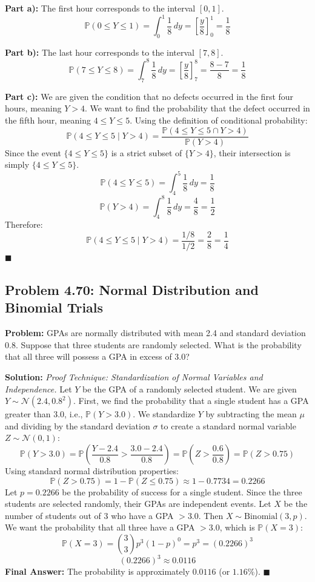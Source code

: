 \documentclass[11pt, a4paper]{article}
\theoremstyle{definition}
\theoremstyle{remark}
\newcommand{\Prob}{\mathbb{P}}
\begin{document}
\textbf{Part a):} The first hour corresponds to the interval $[0, 1]$.
\[ \Prob(0 \le Y \le 1) = \int_{0}^{1} \frac{1}{8} \, dy = \left[ \frac{y}{8} \right]_{0}^{1} = \frac{1}{8} \]

\textbf{Part b):} The last hour corresponds to the interval $[7, 8]$.
\[ \Prob(7 \le Y \le 8) = \int_{7}^{8} \frac{1}{8} \, dy = \left[ \frac{y}{8} \right]_{7}^{8} = \frac{8 - 7}{8} = \frac{1}{8} \]

\textbf{Part c):} We are given the condition that no defects occurred in the first four hours, meaning $Y > 4$. We want to find the probability that the defect occurred in the fifth hour, meaning $4 \le Y \le 5$.
Using the definition of conditional probability:
\[ \Prob(4 \le Y \le 5 \mid Y > 4) = \frac{\Prob(4 \le Y \le 5 \cap Y > 4)}{\Prob(Y > 4)} \]
Since the event $\{4 \le Y \le 5\}$ is a strict subset of $\{Y > 4\}$, their intersection is simply $\{4 \le Y \le 5\}$.
\[ \Prob(4 \le Y \le 5) = \int_{4}^{5} \frac{1}{8} \, dy = \frac{1}{8} \]
\[ \Prob(Y > 4) = \int_{4}^{8} \frac{1}{8} \, dy = \frac{4}{8} = \frac{1}{2} \]
Therefore:
\[ \Prob(4 \le Y \le 5 \mid Y > 4) = \frac{1/8}{1/2} = \frac{2}{8} = \frac{1}{4} \]
$\blacksquare$

\subsection{Problem 4.70: Normal Distribution and Binomial Trials}
\textbf{Problem:} GPAs are normally distributed with mean 2.4 and standard deviation 0.8. Suppose that three students are randomly selected. What is the probability that all three will possess a GPA in excess of 3.0?

\textbf{Solution:}
\textit{Proof Technique: Standardization of Normal Variables and Independence.}
Let $Y$ be the GPA of a randomly selected student. We are given $Y \sim \mathcal{N}(2.4, 0.8^2)$.
First, we find the probability that a single student has a GPA greater than 3.0, i.e., $\Prob(Y > 3.0)$.
We standardize $Y$ by subtracting the mean $\mu$ and dividing by the standard deviation $\sigma$ to create a standard normal variable $Z \sim \mathcal{N}(0,1)$:
\[ \Prob(Y > 3.0) = \Prob\left( \frac{Y - 2.4}{0.8} > \frac{3.0 - 2.4}{0.8} \right) = \Prob\left( Z > \frac{0.6}{0.8} \right) = \Prob(Z > 0.75) \]
Using standard normal distribution properties:
\[ \Prob(Z > 0.75) = 1 - \Prob(Z \le 0.75) \approx 1 - 0.7734 = 0.2266 \]
Let $p = 0.2266$ be the probability of success for a single student.
Since the three students are selected randomly, their GPAs are independent events. Let $X$ be the number of students out of 3 who have a GPA $> 3.0$. Then $X \sim \text{Binomial}(3, p)$.
We want the probability that all three have a GPA $> 3.0$, which is $\Prob(X = 3)$:
\[ \Prob(X = 3) = \binom{3}{3} p^3 (1-p)^0 = p^3 = (0.2266)^3 \]
\[ (0.2266)^3 \approx 0.0116 \]
\textbf{Final Answer:} The probability is approximately $0.0116$ (or $1.16\%$).
$\blacksquare$
\end{document}
